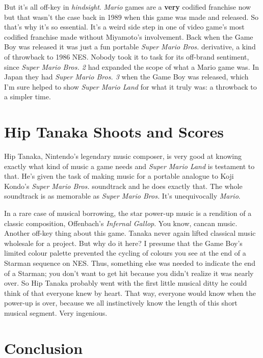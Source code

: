 \documentclass{book}
\begin{document}
But it’s all off-key in \emph{hindsight}. \emph{Mario} games are a \textbf{very} codified franchise now but that wasn’t the case back in 1989 when this game was made and released. So that’s why it’s so essential. It’s a weird side step in one of video game’s most codified franchise made without Miyamoto’s involvement. Back when the Game Boy was released it was just a fun portable \emph{Super Mario Bros.} derivative, a kind of throwback to 1986 NES. Nobody took it to task for its off-brand sentiment, since \emph{Super Mario Bros. 2} had expanded the scope of what a Mario game was. In Japan they had \emph{Super Mario Bros. 3} when the Game Boy was released, which I’m sure helped to show \emph{Super Mario Land} for what it truly was: a throwback to a simpler time.

\FloatBarrier\needspace{5pt}\section*{Hip Tanaka Shoots and Scores}\nopagebreak[4]

Hip Tanaka, Nintendo’s legendary music composer, is very good at knowing exactly what kind of music a game needs and \emph{Super Mario Land} is testament to that. He’s given the task of making music for a portable analogue to Koji Kondo’s \emph{Super Mario Bros.} soundtrack and he does exactly that. The whole soundtrack is as memorable as \emph{Super Mario Bros.} It’s unequivocally \emph{Mario}.

In a rare case of musical borrowing, the star power-up music is a rendition of a classic composition, Offenbach’s \emph{Infernal Gallop}. You know, cancan music. Another off-key thing about this game. Tanaka never again lifted classical music wholesale for a project. But why do it here? I presume that the Game Boy’s limited colour palette prevented the cycling of colours you see at the end of a Starman sequence on NES. Thus, something else was needed to indicate the end of a Starman; you don’t want to get hit because you didn’t realize it was nearly over. So Hip Tanaka probably went with the first little musical ditty he could think of that everyone knew by heart. That way, everyone would know when the power-up is over, because we all instinctively know the length of this short musical segment. Very ingenious.

\FloatBarrier\needspace{5pt}\section*{Conclusion}\nopagebreak[4]
\end{document}
